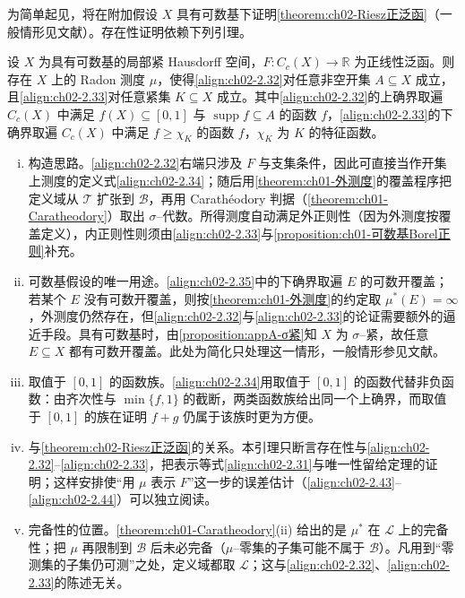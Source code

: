 \documentclass[../../main.tex]{subfiles}%
\begin{document}
为简单起见，将在附加假设 $X$ 具有可数基下证明\cref{theorem:ch02-Riesz正泛函}（一般情形见文献\cite{ref45}）。存在性证明依赖下列引理。

\begin{lemma}\label{lemma:ch02-Riesz构造}
设 $X$ 为具有可数基的局部紧 Hausdorff 空间，$F:C_c(X)\to\mathbb R$ 为正线性泛函。则存在 $X$ 上的 Radon 测度 $\mu$，使得\eqref{align:ch02-2.32}对任意非空开集 $A\subseteq X$ 成立，且\eqref{align:ch02-2.33}对任意紧集 $K\subseteq X$ 成立。其中\eqref{align:ch02-2.32}的上确界取遍 $C_c(X)$ 中满足 $f(X)\subseteq[0,1]$ 与 $\operatorname{supp}f\subseteq A$ 的函数 $f$，\eqref{align:ch02-2.33}的下确界取遍 $C_c(X)$ 中满足 $f\geqslant\chi_K$ 的函数 $f$，$\chi_K$ 为 $K$ 的特征函数。
\end{lemma}

\begin{remark}\label{remark:ch02-Riesz构造动机}
\begin{enumerate}[(i)]
\item 构造思路。\eqref{align:ch02-2.32}右端只涉及 $F$ 与支集条件，因此可直接当作开集上测度的定义式\eqref{align:ch02-2.34}；随后用\cref{theorem:ch01-外测度}的覆盖程序把定义域从 $\mathscr T$ 扩张到 $\mathscr B$，再用 Carathéodory 判据（\cref{theorem:ch01-Caratheodory}）取出 $\sigma$--代数。所得测度自动满足外正则性（因为外测度按覆盖定义），内正则性则须由\eqref{align:ch02-2.33}与\cref{proposition:ch01-可数基Borel正则}补充。
\item 可数基假设的唯一用途。\eqref{align:ch02-2.35}中的下确界取遍 $E$ 的可数开覆盖；若某个 $E$ 没有可数开覆盖，则按\cref{theorem:ch01-外测度}的约定取 $\mu^*(E)=\infty$，外测度仍然存在，但\eqref{align:ch02-2.32}与\eqref{align:ch02-2.33}的论证需要额外的逼近手段。具有可数基时，由\cref{proposition:appA-σ紧}知 $X$ 为 $\sigma$--紧，故任意 $E\subseteq X$ 都有可数开覆盖。此处为简化只处理这一情形，一般情形参见文献\cite{ref45}。
\item 取值于 $[0,1]$ 的函数族。\eqref{align:ch02-2.34}用取值于 $[0,1]$ 的函数代替非负函数：由齐次性与 $\min\{f,1\}$ 的截断，两类函数族给出同一个上确界，而取值于 $[0,1]$ 的族在证明 $f+g$ 仍属于该族时更为方便。
\item 与\cref{theorem:ch02-Riesz正泛函}的关系。本引理只断言存在性与\eqref{align:ch02-2.32}--\eqref{align:ch02-2.33}，把表示等式\eqref{align:ch02-2.31}与唯一性留给定理的证明；这样安排使“用 $\mu$ 表示 $F$”这一步的误差估计（\eqref{align:ch02-2.43}--\eqref{align:ch02-2.44}）可以独立阅读。
\item 完备性的位置。\cref{theorem:ch01-Caratheodory}(ii) 给出的是 $\mu^*$ 在 $\mathscr L$ 上的完备性；把 $\mu$ 再限制到 $\mathscr B$ 后未必完备（$\mu$--零集的子集可能不属于 $\mathscr B$）。凡用到“零测集的子集仍可测”之处，定义域都取 $\mathscr L$；这与\eqref{align:ch02-2.32}、\eqref{align:ch02-2.33}的陈述无关。
\end{enumerate}
\end{remark}
\end{document}
